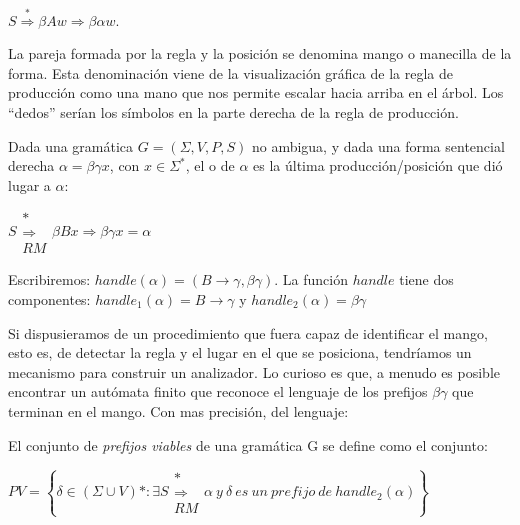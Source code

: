 \begin{center}
$S \stackrel{*}{\Longrightarrow} \beta A w \Longrightarrow \beta \alpha w$. 
\end{center}

La pareja formada por la regla y la posición 
se denomina mango o manecilla de la forma. Esta denominación viene
de la visualización gráfica de la regla de producción como una mano
que nos permite escalar hacia arriba en el árbol. Los ``dedos'' serían los
símbolos en la parte derecha de la regla de producción.

\begin{definition}
Dada una gramática $G=(\Sigma,V,P,S)$ no ambigua, y dada una forma sentencial derecha 
$\alpha = \beta \gamma x$, con $x \in \Sigma^*$, el  o   de 
$\alpha$ es la última producción/posición  que dió lugar a $\alpha$:

\begin{center}
$ S \begin{array}{c} *\\\Longrightarrow  \\ {\scriptstyle RM} \end{array} \beta B x \Longrightarrow \beta \gamma x = \alpha$
\end{center}

\end{definition}
Escribiremos: 
$handle(\alpha) = (B \rightarrow \gamma, \beta \gamma)$. La función $handle$ tiene dos componentes:
$handle_1(\alpha) = B \rightarrow \gamma$ y 
$handle_2(\alpha) =  \beta \gamma$

Si dispusieramos de un procedimiento que fuera capaz de identificar el mango,
esto es, de detectar la regla y el lugar en el que se posiciona, tendríamos un
mecanismo para construir un analizador. 
Lo curioso es que, a menudo es posible encontrar un autómata finito que
reconoce el lenguaje de los prefijos $\beta \gamma$  que terminan 
en el mango. Con mas precisión, del lenguaje:

\begin{definition}
El conjunto de \emph{prefijos viables} de una gramática G se define
como  el conjunto:

\begin{center}
$PV = \left \{ \delta \in (\Sigma \cup V)* :  \exists S \begin{array}{c} *\\ \Longrightarrow \\ {\scriptstyle RM} \end{array} \alpha\  y\ \delta\ es\ un\ prefijo\ de\  handle_2(\alpha) \right \}$ 
\end{center}
\end{definition}

